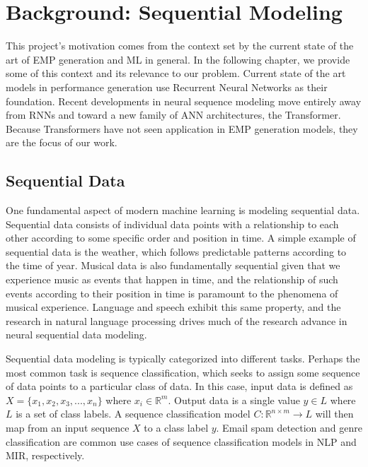\chapter{Background: Sequential Modeling}\label{ch:ch3}

This project's motivation comes from the context set by the current state of the art of EMP generation and ML in general. In the following chapter, we provide some of this context and its relevance to our problem.  Current state of the art models in performance generation use Recurrent Neural Networks as their foundation. Recent developments in neural sequence modeling move entirely away from RNNs and toward a new family of ANN architectures, the Transformer. Because Transformers have not seen application in EMP generation models, they are the focus of our work. 

\section{Sequential Data}\label{sec:sequential-data}
One fundamental aspect of modern machine learning is modeling sequential data. Sequential data consists of individual data points with a relationship to each other according to some specific order and position in time. A simple example of sequential data is the weather, which follows predictable patterns according to the time of year. Musical data is also fundamentally sequential\cite{widmer2016getting} given that we experience music as events that happen in time, and the relationship of such events according to their position in time is paramount to the phenomena of musical experience. Language and speech exhibit this same property, and the research in natural language processing drives much of the research advance in neural sequential data modeling. 

Sequential data modeling is typically categorized into different tasks. Perhaps the most common task is sequence classification, which seeks to assign some sequence of data points to a particular class of data. In this case, input data is defined as $X = \{x_1, x_2, x_3, ..., x_n\}$ where $x_i \in \mathbb{R}^m$. Output data is a single value $y \in L$ where $L$ is a set of class labels. A sequence classification model $C: \mathbb{R}^{n \times m} \rightarrow L$ will then map from an input sequence $X$ to a class label $y$. Email spam detection and genre classification are common use cases of sequence classification models in NLP and MIR, respectively. 

\newcommand{\seq}{\emph{seq2seq}}

